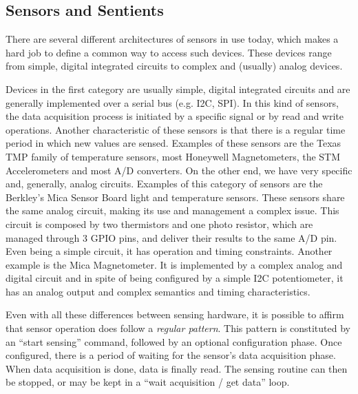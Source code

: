 
\subsection{Sensors and Sentients}



There are several different architectures of sensors in use today, which
makes a hard job to define a common way to access such devices.  These
devices range from simple, digital integrated circuits to complex and
(usually) analog devices.


Devices in the first category are usually simple, digital integrated
circuits and are generally implemented over a serial bus (e.g. I2C,
SPI). In this kind of sensors, the data acquisition process is initiated
by a specific signal or by read and write operations. Another characteristic
of these sensors is that there is a regular time period in which new
values are sensed. Examples of these sensors are the Texas TMP family of
temperature sensors, most Honeywell Magnetometers, the STM
Accelerometers and most A/D converters.
On the other end, we have very specific and, generally, analog circuits.
Examples of this category of sensors are the Berkley's Mica Sensor Board
light and temperature sensors. These sensors share the same analog
circuit, making its use and management a complex issue. This circuit is
composed by two thermistors and one photo resistor, which are managed
through 3 GPIO pins, and deliver their results to the same A/D
pin. Even being a simple circuit, it has operation and timing
constraints. Another example is the Mica Magnetometer. It is implemented
by a complex analog and digital circuit and in spite of being configured
by a simple I2C potentiometer, it has an analog output and complex
semantics and timing characteristics.

Even with all these differences between sensing hardware, it is possible
to affirm that sensor operation does follow a \emph{regular pattern}.
This pattern is constituted by an ``start sensing'' command, followed by
an optional configuration phase. Once configured, there is a period of
waiting for the sensor's data acquisition phase. When data acquisition
is done, data is finally read.  The sensing routine can then be stopped,
or may be kept in a ``wait acquisition / get data'' loop.

